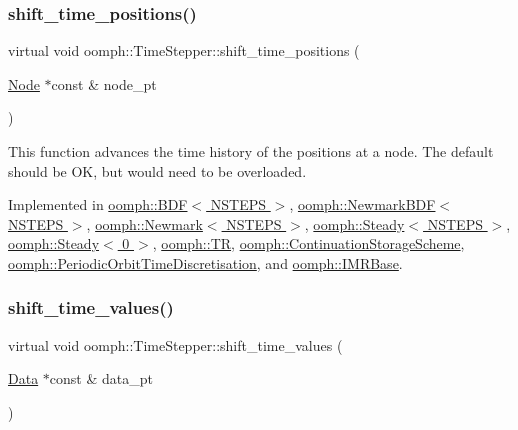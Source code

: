 \subsubsection{\texorpdfstring{shift\+\_\+time\+\_\+positions()}{shift\_time\_positions()}}
{\footnotesize\ttfamily virtual void oomph\+::\+Time\+Stepper\+::shift\+\_\+time\+\_\+positions (\begin{DoxyParamCaption}\item[{\hyperlink{classoomph_1_1Node}{Node} $\ast$const \&}]{node\+\_\+pt }\end{DoxyParamCaption})\hspace{0.3cm}{\ttfamily [pure virtual]}}



This function advances the time history of the positions at a node. The default should be OK, but would need to be overloaded. 



Implemented in \hyperlink{classoomph_1_1BDF_aad5191a5605337d43458d42f67460dbd}{oomph\+::\+B\+D\+F$<$ N\+S\+T\+E\+P\+S $>$}, \hyperlink{classoomph_1_1NewmarkBDF_a86ac259d50e62295d13790a5fe49010d}{oomph\+::\+Newmark\+B\+D\+F$<$ N\+S\+T\+E\+P\+S $>$}, \hyperlink{classoomph_1_1Newmark_af56a2965f66e9a181b336e11cc613b21}{oomph\+::\+Newmark$<$ N\+S\+T\+E\+P\+S $>$}, \hyperlink{classoomph_1_1Steady_a4b3c9877146cb5a3673b54e0f02d9625}{oomph\+::\+Steady$<$ N\+S\+T\+E\+P\+S $>$}, \hyperlink{classoomph_1_1Steady_a4b3c9877146cb5a3673b54e0f02d9625}{oomph\+::\+Steady$<$ 0 $>$}, \hyperlink{classoomph_1_1TR_a15ab8859ae1a87f14687dcec94f68e03}{oomph\+::\+TR}, \hyperlink{classoomph_1_1ContinuationStorageScheme_a2271fd0ad65dda38686851df5a3970d5}{oomph\+::\+Continuation\+Storage\+Scheme}, \hyperlink{classoomph_1_1PeriodicOrbitTimeDiscretisation_a246a40f0cfe0ebc3d5020ede92a2d0e9}{oomph\+::\+Periodic\+Orbit\+Time\+Discretisation}, and \hyperlink{classoomph_1_1IMRBase_a61d4487fcf0a9eb7a829b08027a9500f}{oomph\+::\+I\+M\+R\+Base}.

\mbox{\label{classoomph_1_1TimeStepper_a010a3b03a23a1c48dd8ca10641427255}} 
\subsubsection{\texorpdfstring{shift\+\_\+time\+\_\+values()}{shift\_time\_values()}}
{\footnotesize\ttfamily virtual void oomph\+::\+Time\+Stepper\+::shift\+\_\+time\+\_\+values (\begin{DoxyParamCaption}\item[{\hyperlink{classoomph_1_1Data}{Data} $\ast$const \&}]{data\+\_\+pt }\end{DoxyParamCaption})\hspace{0.3cm}{\ttfamily [pure virtual]}}



